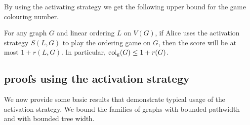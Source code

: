 By using the activating strategy we get the following upper bound for the game colouring number. 

\begin{theorem} \label{thm:KIERSTEAD1}
    For any graph $G$ and linear ordering $L$ on $V(G)$, if Alice uses the activation strategy $S(L, G)$ to play the ordering game on $G$, then the score will be at most $1+r(L, G)$. In particular, $\operatorname{col_g}(G) \leq 1+r(G)$.
\end{theorem}



\subsection{proofs using the activation strategy} \label{sec:actvStratProofs}
We now provide some basic results that demonstrate typical usage of the activation strategy. We bound the families of graphs with bounded pathwidth and with bounded tree width.

